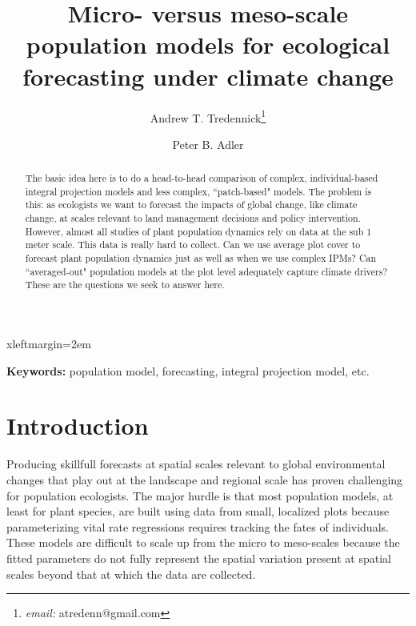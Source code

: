 \documentclass[12pt]{article}
\begin{document}



 {xleftmargin=2em}

\title{\LARGE Micro- versus meso-scale population models for ecological forecasting under climate change}
\author[]{\large Andrew T. Tredennick\footnote{\emph{email:} atredenn@gmail.com}}
\author[]{\large Peter B. Adler}
\maketitle

\begin{abstract}
The basic idea here is to do a head-to-head comparison of complex, individual-based integral projection models and less complex, ``patch-based" models. The problem is this: as ecologists we want to forecast the impacts of global change, like climate change, at scales relevant to land management decisions and policy intervention. However, almost all studies of plant population dynamics rely on data at the sub 1 meter scale. This data is really hard to collect. Can we use average plot cover to forecast plant population dynamics just as well as when we use complex IPMs? Can ``averaged-out" population models at the plot level adequately capture climate drivers? These are the questions we seek to answer here.
\end{abstract}

\noindent{}\textbf{Keywords:} population model, forecasting, integral projection model, etc.

\section{Introduction}
Producing skillfull forecasts at spatial scales relevant to global environmental changes that play out at the landscape and regional scale has proven challenging for population ecologists. The major hurdle is that most population models, at least for plant species, are built using data from small, localized plots because parameterizing vital rate regressions requires tracking the fates of individuals. These models are difficult to scale up from the micro to meso-scales because the fitted parameters do not fully represent the spatial variation present at spatial scales beyond that at which the data are collected. 
\end{document}
